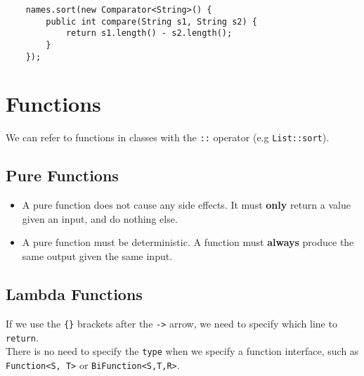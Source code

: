\documentclass[10pt,landscape,a4paper]{article}
\begin{document}
\begin{multicols*}{4}
\begin{lstlisting}
    names.sort(new Comparator<String>() {
        public int compare(String s1, String s2) {
            return s1.length() - s2.length();
        }
    });
\end{lstlisting}

\section{Functions}
We can refer to functions in classes with the \texttt{::} operator (e.g \texttt{List::sort}).
\subsection{Pure Functions}
\begin{itemize}
    \item A pure function does not cause any side effects. It must \textbf{only} return a value given an input, and do nothing else.
    \item A pure function must be deterministic. A function must \textbf{always} produce the same output given the same input.
\end{itemize}

\subsection{Lambda Functions}
If we use the \texttt{\{\}} brackets after the \texttt{->} arrow, we need to specify which line to \texttt{return}. \\
There is no need to specify the \texttt{type} when we specify a function interface, such as \texttt{Function<S, T>} or \texttt{BiFunction<S,T,R>}.


\end{multicols*}
\end{document}
